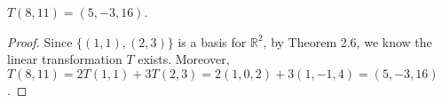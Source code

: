 \begin{Exercise}
	\begin{answer}
		$T(8,11) = (5,-3,16)$.
	\end{answer}
	\begin{proof}
		Since $\{(1,1),(2,3)\}$ is a basis for $\mathbb{R}^2$, by Theorem 2.6, we know the linear transformation $T$ exists.
		Moreover, $T(8,11) = 2T(1,1)+3T(2,3) = 2(1,0,2)+3(1,-1,4) = (5,-3,16)$.
	\end{proof}
\end{Exercise}